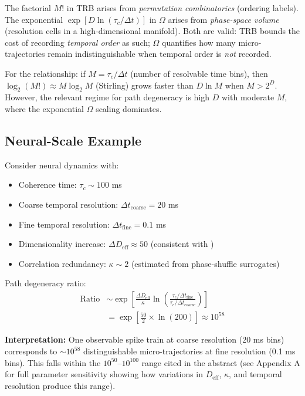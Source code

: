 \documentclass[12pt]{article}
\numberwithin{equation}{section}
\begin{document}
The factorial $M!$ in TRB arises from \emph{permutation combinatorics} (ordering labels). The exponential $\exp[D \ln(\tau_c/\Delta t)]$ in $\Omega$ arises from \emph{phase-space volume} (resolution cells in a high-dimensional manifold). Both are valid: TRB bounds the cost of recording \emph{temporal order} as such; $\Omega$ quantifies how many micro-trajectories remain indistinguishable when temporal order is \emph{not} recorded.

For the relationship: if $M = \tau_c/\Delta t$ (number of resolvable time bins), then $\log_2(M!) \approx M\log_2 M$ (Stirling) grows faster than $D\ln M$ when $M > 2^D$. However, the relevant regime for path degeneracy is high $D$ with moderate $M$, where the exponential $\Omega$ scaling dominates.

\subsection{Neural-Scale Example}

Consider neural dynamics with:
\begin{itemize}
\item Coherence time: $\tau_c \sim 100$ ms
\item Coarse temporal resolution: $\Delta t_{\text{coarse}} = 20$ ms
\item Fine temporal resolution: $\Delta t_{\text{fine}} = 0.1$ ms
\item Dimensionality increase: $\Delta D_{\text{eff}} \approx 50$ (consistent with \cite{stringer2019})
\item Correlation redundancy: $\kappa \sim 2$ (estimated from phase-shuffle surrogates)
\end{itemize}

Path degeneracy ratio:
\begin{align}
\text{Ratio} &\sim \exp\left[\frac{\Delta D_{\text{eff}}}{\kappa} \ln\left(\frac{\tau_c/\Delta t_{\text{fine}}}{\tau_c/\Delta t_{\text{coarse}}}\right)\right] \nonumber\\
&= \exp\left[\frac{50}{2} \times \ln(200)\right] \approx 10^{58}
\end{align}

\textbf{Interpretation:} One observable spike train at coarse resolution (20 ms bins) corresponds to $\sim 10^{58}$ distinguishable micro-trajectories at fine resolution (0.1 ms bins). This falls within the $10^{50}$--$10^{100}$ range cited in the abstract (see Appendix A for full parameter sensitivity showing how variations in $D_{\text{eff}}$, $\kappa$, and temporal resolution produce this range).
\end{document}
